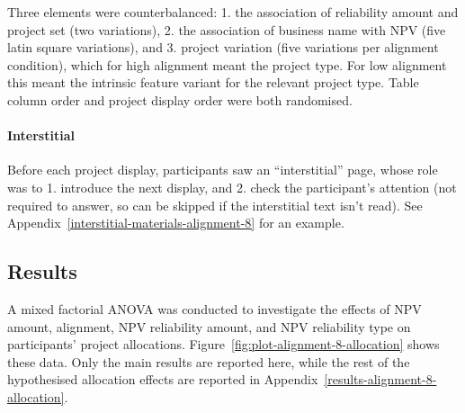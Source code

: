 \documentclass[a4paper, nobind, dvipsnames]{templates/ociamthesis}
\theoremstyle{definition}
\theoremstyle{definition}
\theoremstyle{definition}
\theoremstyle{definition}
\theoremstyle{remark}
\begin{document}
Three elements were counterbalanced: 1. the association of reliability amount
and project set (two variations), 2. the association of business name with NPV
(five latin square variations), and 3. project variation (five variations per
alignment condition), which for high alignment meant the project type. For low
alignment this meant the intrinsic feature variant for the relevant project
type. Table column order and project display order were both randomised.

\paragraph{Interstitial}

Before each project display, participants saw an ``interstitial'' page, whose role
was to 1. introduce the next display, and 2. check the participant's attention
(not required to answer, so can be skipped if the interstitial text isn't read).
See Appendix~\ref{interstitial-materials-alignment-8} for an example.

\subsection{Results}

A mixed factorial ANOVA was conducted to investigate the effects of NPV amount,
alignment, NPV reliability amount, and NPV reliability type on participants'
project allocations. Figure~\ref{fig:plot-alignment-8-allocation} shows these
data. Only the main results are reported here, while the rest of the
hypothesised allocation effects are reported in
Appendix~\ref{results-alignment-8-allocation}.
\end{document}
